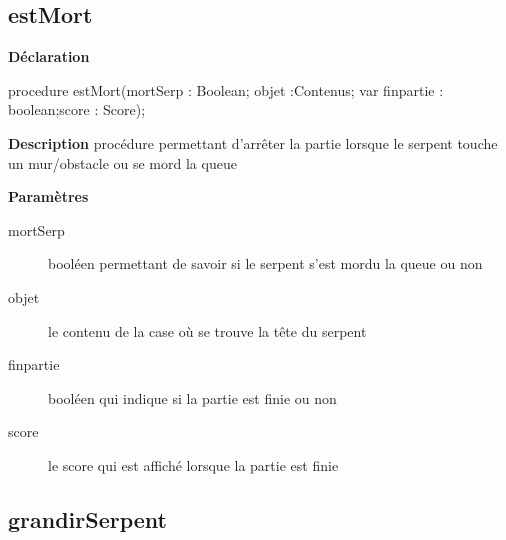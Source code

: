 \documentclass{report}
\newif\ifpdf
\begin{document}
\subsection*{estMort}
\fi
\label{Jouer-estMort}
\begin{list}{}{
\setlength{\itemindent}{0cm}
\setlength{\listparindent}{0cm}
\setlength{\leftmargin}{\evensidemargin}
\addtolength{\leftmargin}{\tmplength}
\settowidth{\labelsep}{X}
\addtolength{\leftmargin}{\labelsep}
\setlength{\labelwidth}{\tmplength}
}
\item[\textbf{Déclaration}\hfill]
\ifpdf
\begin{flushleft}
\fi
\begin{ttfamily}
procedure estMort(mortSerp : Boolean; objet :Contenus; var finpartie : boolean;score : Score);\end{ttfamily}

\ifpdf
\end{flushleft}
\fi

\par
\item[\textbf{Description}]
procédure permettant d'arrêter la partie lorsque le serpent touche un mur/obstacle ou se mord la queue    \par
\item[\textbf{Paramètres}]
\begin{description}
\item[mortSerp] booléen permettant de savoir si le serpent s'est mordu la queue ou non
\item[objet] le contenu de la case où se trouve la tête du serpent
\item[finpartie] booléen qui indique si la partie est finie ou non
\item[score] le score qui est affiché lorsque la partie est finie
\end{description}


\end{list}
\ifpdf
\subsection*{\large{\textbf{grandirSerpent}}\normalsize\hspace{1ex}\hrulefill}
\else
\end{document}
